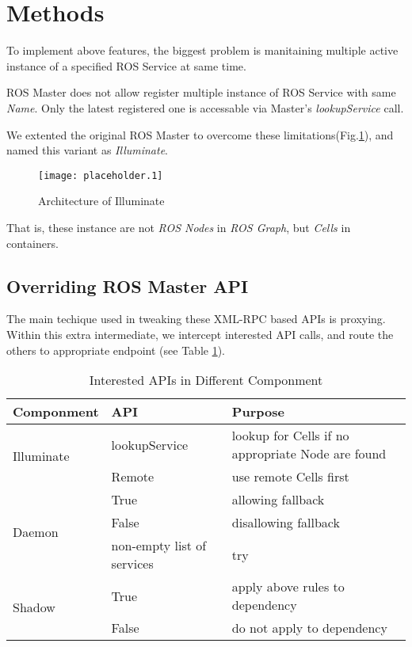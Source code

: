 \section{Methods}

To implement above features, the biggest problem is manitaining multiple active instance of a specified ROS Service at same time.

ROS Master does not allow register multiple instance of ROS Service with same \emph{Name}.
Only the latest registered one is accessable via Master's \emph{lookupService} call.

We extented the original ROS Master to overcome these limitations(Fig.\ref{figure:illuminate}),
and named this variant as \emph{Illuminate}.

\begin{figure}[h]
\centering
\texttt{[image: placeholder.1]}
\caption{Architecture of Illuminate}
\label{figure:illuminate}
\end{figure}

That is, these instance are not \emph{ROS Nodes} in \emph{ROS Graph}, but \emph{Cells} in containers.

\subsection{Overriding ROS Master API}
The main techique used in tweaking these XML-RPC based APIs is proxying.
Within this extra intermediate, we intercept interested API calls,
and route the others to appropriate endpoint (see Table \ref{table:int}).

\begin{table}
    \renewcommand{\arraystretch}{1.3}
    \caption{Interested APIs in Different Componment}
    \label{table:int}
    \centering
    \begin{tabular}{|l|l|l|}
        \hline
        \bfseries Componment & \bfseries  API & \bfseries Purpose \\
        \hline
        \multirow{2}{*}{Illuminate}  & lookupService & lookup for Cells if no appropriate Node are found \\
        \cline{2-3}
                                     & Remote & use remote Cells first \\
        \hline
        \multirow{3}{*}{Daemon}      & True   & allowing fallback \\
        \cline{2-3}
                                     & False  & disallowing fallback \\
        \cline{2-3}
                                     & non-empty list of services & try  \\
        \hline
        \multirow{2}{*}{Shadow} & True   & apply above rules to dependency \\
        \cline{2-3}
                                     & False  & do not apply to dependency \\
        \hline
    \end{tabular}
\end{table} 

